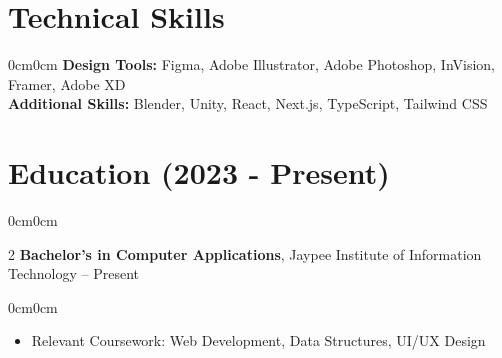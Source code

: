 \documentclass[10pt, letterpaper]{article}
\newenvironment{highlights}{\begin{itemize}[topsep=0.10 cm, parsep=0.10 cm, partopsep=0pt, itemsep=0pt, leftmargin=10pt]}{\end{itemize}}
\newenvironment{onecolentry}{\begin{adjustwidth}{0cm}{0cm}}{\end{adjustwidth}}
\newenvironment{twocolentry}[2][]{\onecolentry\def\secondColumn{#2}\setcolumnwidth{\fill, 4.5 cm}\begin{paracol}{2}}{\switchcolumn \raggedleft \secondColumn\end{paracol}\endonecolentry}
\begin{document}
\section{Technical Skills}
\begin{onecolentry}
    \textbf{Design Tools:} Figma, Adobe Illustrator, Adobe Photoshop, InVision, Framer, Adobe XD \\
    \textbf{Additional Skills:} Blender, Unity, React, Next.js, TypeScript, Tailwind CSS
\end{onecolentry}

\section{Education (2023 - Present)}
\begin{twocolentry}{2021 -- Present}
    \textbf{Bachelor's in Computer Applications}, Jaypee Institute of Information Technology
\end{twocolentry}
\begin{onecolentry}
    \begin{highlights}
        \item Relevant Coursework: Web Development, Data Structures, UI/UX Design
    \end{highlights}
\end{onecolentry}
\end{document}
